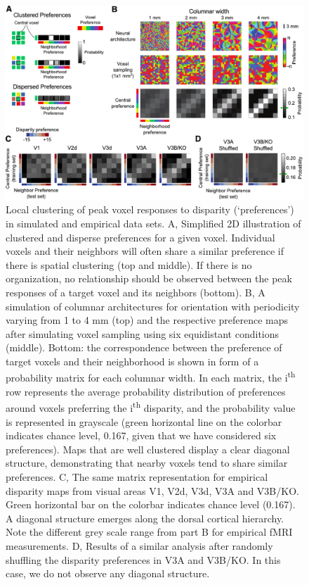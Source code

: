 \begin{figure}
  \centering
  \includegraphics[width=14cm, keepaspectratio]{fig3}
  \caption[Local clustering of peak voxel responses to disparity.]{Local clustering of peak voxel responses to disparity (`preferences') in simulated and empirical data sets. A, Simplified 2D illustration of clustered and disperse preferences for a given voxel. Individual voxels and their neighbors will often share a similar preference if there is spatial clustering (top and middle). If there is no organization, no relationship should be observed between the peak responses of a target voxel and its neighbors (bottom). B, A simulation of columnar architectures for orientation \cite{ROJER:1990bq} with periodicity varying from 1 to 4 mm (top) and the respective preference maps after simulating voxel sampling using six equidistant conditions (middle). Bottom: the correspondence between the preference of target voxels and their neighborhood is shown in form of a probability matrix for each columnar width. In each matrix, the i\textsuperscript{th} row represents the average probability distribution of preferences around voxels preferring the i\textsuperscript{th} disparity, and the probability value is represented in grayscale (green horizontal line on the colorbar indicates chance level, 0.167, given that we have considered six preferences). Maps that are well clustered display a clear diagonal structure, demonstrating that nearby voxels tend to share similar preferences. C, The same matrix representation for empirical disparity maps from visual areas V1, V2d, V3d, V3A and V3B/KO. Green horizontal bar on the colorbar indicates chance level (0.167). A diagonal structure emerges along the dorsal cortical hierarchy. Note the different grey scale range from part B for empirical fMRI measurements. D, Results of a similar analysis after randomly shuffling the disparity preferences in V3A and V3B/KO. In this case, we do not observe any diagonal structure.}
  \label{fig:ch4fig3}
\end{figure}

